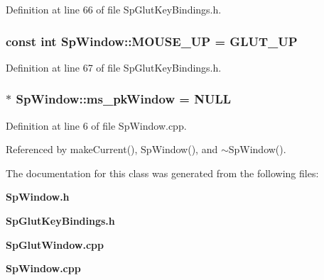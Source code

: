 Definition at line 66 of file Sp\-Glut\-Key\-Bindings.h.
\subsubsection{\setlength{\rightskip}{0pt plus 5cm}const int {\bf Sp\-Window::MOUSE\_\-UP} = GLUT\_\-UP\hspace{0.3cm}{\tt  [static]}}\label{classSpark_1_1SpWindow_s30}


Definition at line 67 of file Sp\-Glut\-Key\-Bindings.h.
\subsubsection{ $\ast$ {\bf Sp\-Window::ms\_\-pk\-Window} = NULL\hspace{0.3cm}{\tt  [static, protected]}}\label{classSpark_1_1SpWindow_t0}


Definition at line 6 of file Sp\-Window.cpp.

Referenced by make\-Current(), Sp\-Window(), and $\sim$Sp\-Window().

The documentation for this class was generated from the following files:\begin{CompactItemize}
\item 
{\bf Sp\-Window.h}\item 
{\bf Sp\-Glut\-Key\-Bindings.h}\item 
{\bf Sp\-Glut\-Window.cpp}\item 
{\bf Sp\-Window.cpp}\end{CompactItemize}
